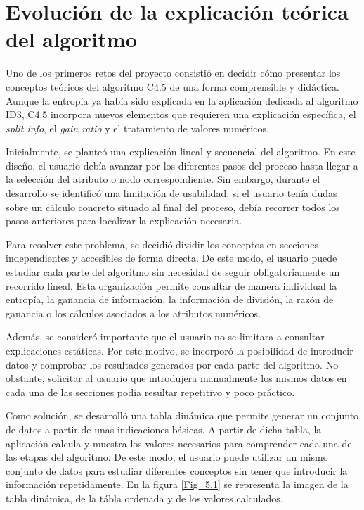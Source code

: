 \section{Evolución de la explicación teórica del algoritmo}

Uno de los primeros retos del proyecto consistió en decidir cómo presentar los conceptos teóricos del algoritmo C4.5 de una forma comprensible y didáctica. Aunque la entropía ya había sido explicada en la aplicación dedicada al algoritmo ID3, C4.5 incorpora nuevos elementos que requieren una explicación específica, el \textit{split info}, el \textit{gain ratio} y el tratamiento de valores numéricos.

Inicialmente, se planteó una explicación lineal y secuencial del algoritmo. En este diseño, el usuario debía avanzar por los diferentes pasos del proceso hasta llegar a la selección del atributo o nodo correspondiente. Sin embargo, durante el desarrollo se identificó una limitación de usabilidad: si el usuario tenía dudas sobre un cálculo concreto situado al final del proceso, debía recorrer todos los pasos anteriores para localizar la explicación necesaria.

Para resolver este problema, se decidió dividir los conceptos en secciones independientes y accesibles de forma directa. De este modo, el usuario puede estudiar cada parte del algoritmo sin necesidad de seguir obligatoriamente un recorrido lineal. Esta organización permite consultar de manera individual la entropía, la ganancia de información, la información de división, la razón de ganancia o los cálculos asociados a los atributos numéricos.

Además, se consideró importante que el usuario no se limitara a consultar explicaciones estáticas. Por este motivo, se incorporó la posibilidad de introducir datos y comprobar los resultados generados por cada parte del algoritmo. No obstante, solicitar al usuario que introdujera manualmente los mismos datos en cada una de las secciones podía resultar repetitivo y poco práctico.

Como solución, se desarrolló una tabla dinámica que permite generar un conjunto de datos a partir de unas indicaciones básicas. A partir de dicha tabla, la aplicación calcula y muestra los valores necesarios para comprender cada una de las etapas del algoritmo. De este modo, el usuario puede utilizar un mismo conjunto de datos para estudiar diferentes conceptos sin tener que introducir la información repetidamente. En la figura \ref{Fig_5.1} se representa la imagen de la tabla dinámica, de la tábla ordenada y de los valores calculados.

